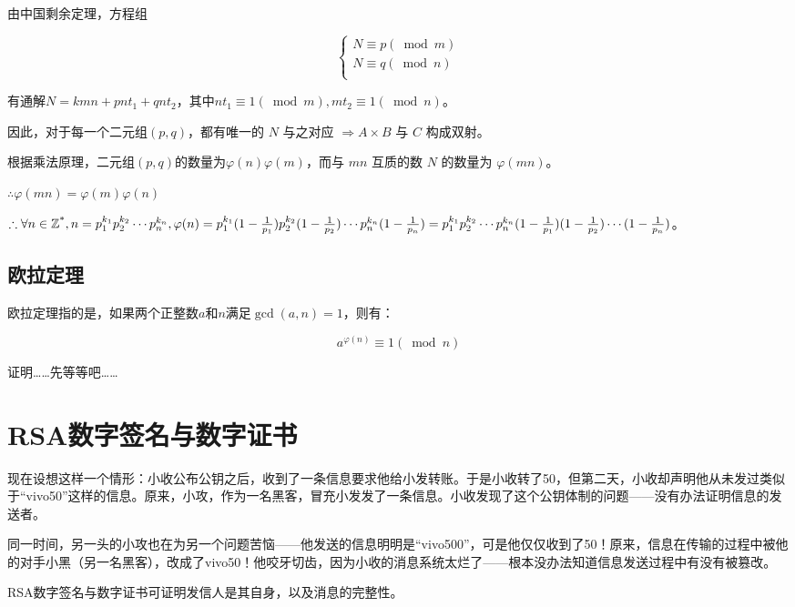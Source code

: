 \documentclass[a4paper]{article}         %
\begin{document}
由中国剩余定理，方程组

\[
    \begin{cases}
        N \equiv p(\bmod m)\\
        N \equiv q(\bmod n)\\
    \end{cases}
\]

有通解$N = kmn + pnt_1 + qnt_2$，其中$nt_1 \equiv 1(\bmod m), mt_2 \equiv 1 (\bmod n)$。

因此，对于每一个二元组$(p, q)$，都有唯一的 $N$ 与之对应 $\Rightarrow A \times B$ 与 $C$ 构成双射。

根据乘法原理，二元组$(p, q)$的数量为$\varphi(n) \varphi(m)$，而与 $mn$ 互质的数 $N$ 的数量为 $\varphi(mn)$。

$\therefore \varphi(mn) = \varphi(m) \varphi(n)$

$\therefore \forall n \in \mathbb{Z\textsuperscript{*}}, n = p_1^{k_1}p_2^{k_2} \cdots p_n^{k_n}, \varphi(n) = p_1^{k_1}(1 - \frac{1}{p_1})p_2^{k_2}(1 - \frac{1}{p_2})\cdots p_n^{k_n}(1 - \frac{1}{p_n})=p_1^{k_1}p_2^{k_2}\cdots p_n^{k_n}(1 - \frac{1}{p_1})(1 - \frac{1}{p_2})\cdots (1 - \frac{1}{p_n})$。

\subsection{欧拉定理}

欧拉定理指的是，如果两个正整数$a$和$n$满足$\gcd(a, n) = 1$，则有：

\[
	a^{\varphi(n)} \equiv 1 (\bmod n)
\]

证明……先等等吧……

\section{RSA数字签名与数字证书}

现在设想这样一个情形：小收公布公钥之后，收到了一条信息要求他给小发转账。于是小收转了50，但第二天，小收却声明他从未发过类似于“vivo50”这样的信息。原来，小攻，作为一名黑客，冒充小发发了一条信息。小收发现了这个公钥体制的问题——没有办法证明信息的发送者。

同一时间，另一头的小攻也在为另一个问题苦恼——他发送的信息明明是“vivo500”，可是他仅仅收到了50！原来，信息在传输的过程中被他的对手小黑（另一名黑客），改成了vivo50！他咬牙切齿，因为小收的消息系统太烂了——根本没办法知道信息发送过程中有没有被篡改。

RSA数字签名与数字证书可证明发信人是其自身，以及消息的完整性。
\end{document}
